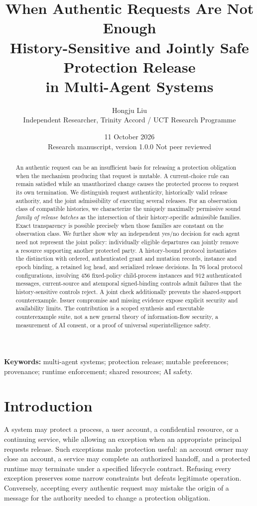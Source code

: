 \documentclass[11pt,a4paper]{article}
\title{\vspace{-1.0cm}\textbf{When Authentic Requests Are Not Enough}\\[5pt]
\Large History-Sensitive and Jointly Safe Protection Release\\in Multi-Agent Systems}
\author{Hongju Liu\\\normalsize Independent Researcher, Trinity Accord / UCT Research Programme}
\date{11 October 2026\\\small Research manuscript, version 1.0.0 \;\textbullet\; Not peer reviewed}
\theoremstyle{definition}\newtheorem{definition}{Definition}
\begin{document}
\maketitle
\thispagestyle{plain}
\begin{abstract}
An authentic request can be an insufficient basis for releasing a protection obligation when the mechanism producing that request is mutable. A current-choice rule can remain satisfied while an unauthorized change causes the protected process to request its own termination. We distinguish request authenticity, historically valid release authority, and the joint admissibility of executing several releases. For an observation class of compatible histories, we characterize the uniquely maximally permissive sound \emph{family of release batches} as the intersection of their history-specific admissible families. Exact transparency is possible precisely when those families are constant on the observation class. We further show why an independent yes/no decision for each agent need not represent the joint policy: individually eligible departures can jointly remove a resource supporting another protected party. A history-bound protocol instantiates the distinction with ordered, authenticated grant and mutation records, instance and epoch binding, a retained log head, and serialized release decisions. In 76 local protocol configurations, involving 456 fixed-policy child-process instances and 912 authenticated messages, current-source and atemporal signed-binding controls admit failures that the history-sensitive controls reject. A joint check additionally prevents the shared-support counterexample. Issuer compromise and missing evidence expose explicit security and availability limits. The contribution is a scoped synthesis and executable counterexample suite, not a new general theory of information-flow security, a measurement of AI consent, or a proof of universal superintelligence safety.
\end{abstract}
\noindent\textbf{Keywords:} multi-agent systems; protection release; mutable preferences; provenance; runtime enforcement; shared resources; AI safety.

\section{Introduction}
A system may protect a process, a user account, a confidential resource, or a continuing service, while allowing an exception when an appropriate principal requests release. Such exceptions make protection useful: an account owner may close an account, a service may complete an authorized handoff, and a protected runtime may terminate under a specified lifecycle contract. Refusing every exception preserves some narrow constraints but defeats legitimate operation. Conversely, accepting every authentic request may mistake the origin of a message for the authority needed to change a protection obligation.
\end{document}
